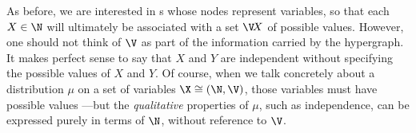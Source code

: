 %
%
As before,
we are interested in \hgraph s whose nodes represent variables,
so that each $X \in \N$ will ultimately be associated with a
set $\V\!X$ of possible values.
However, one should not think of $\V$ as part of the information carried by the hypergraph. 
%
{%
It makes perfect sense to say that $X$ and $Y$ are independent without specifying the possible values of $X$ and $Y$.
}%
Of course, when we talk concretely about a distribution $\mu$ on a set of variables $\X \cong (\N, \V)$, those variables must have possible values
\unskip---but the \emph{qualitative} properties of $\mu$, such as independence, can be expressed purely in terms of $\N$, without reference to $\V$. 
%
%


